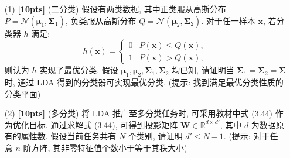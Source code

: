\documentclass[a4paper,UTF8]{article}
\numberwithin{equation}{section}
\theoremstyle{definition}
\newcommand{\bds}{\boldsymbol}
\begin{document}
\begin{enumerate}
	\item[(1)] \textbf{[10pts]} (二分类) 假设有两类数据, 其中正类服从高斯分布$P=\mathcal{N}\left(\bds{\mu}_1, \bds{\Sigma}_1\right)$, 负类服从高斯分布 $Q=\mathcal{N}\left(\bds{\mu}_2, \bds{\Sigma}_2\right)$. 对于任一样本 $\bds{x}$, 若分类器 $h$ 满足:
     $$
     h(\bds{x})= \begin{cases}0 & P(\bds{x})\leq Q(\bds{x}), \\ 1 & P(\bds{x})>Q(\bds{x}), \end{cases}
     $$
     则认为 $h$ 实现了最优分类. 假设 $\bds{\mu}_1,\bds{\mu}_2, \bds{\Sigma}_1, \bds{\Sigma}_2$ 均已知, 请证明当 $\bds{\Sigma}_1=\bds{\Sigma}_2=\bds{\Sigma}$ 时, 通过 LDA 得到的分类器可实现最优分类.
     (提示: 找到满足最优分类性质的分类平面)
	\item[(2)] \textbf{[10pts]} (多分类) 将 LDA 推广至多分类任务时, 可采用教材中式 (3.44) 作为优化目标. 通过求解式 (3.44), 可得到投影矩阵 $\mathbf{W}\in \mathbb{R}^{d\times d'}$, 其中 $d$ 为数据原有的属性数. 假设当前任务共有 $N$ 个类别, 请证明 $d'\leq N-1$. (提示: 对于任意 $n$ 阶方阵, 其非零特征值个数小于等于其秩大小)
\end{enumerate}
\end{document}
